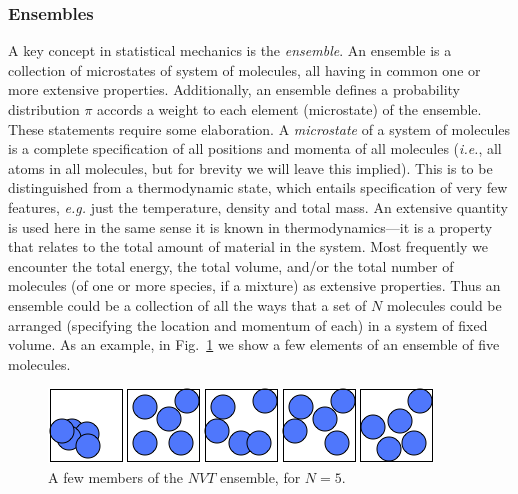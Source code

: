 \documentclass[]{article}
\begin{document}
\subsubsection{Ensembles}\label{ensembles}

A key concept in statistical mechanics is the \emph{ensemble}. An
ensemble is a collection of microstates of system of molecules, all
having in common one or more extensive properties. Additionally, an
ensemble defines a probability distribution $\pi$ accords a weight to each
element (microstate) of the ensemble. These statements require some
elaboration. A \emph{microstate} of a system of molecules is a complete
specification of all positions and momenta of all molecules
(\emph{i.e.}, all atoms in all molecules, but for brevity we will leave
this implied). This is to be distinguished from a thermodynamic state,
which entails specification of very few features, \emph{e.g.} just the
temperature, density and total mass. An extensive quantity is used here
in the same sense it is known in thermodynamics---it is a property that
relates to the total amount of material in the system. Most frequently
we encounter the total energy, the total volume, and/or the total number
of molecules (of one or more species, if a mixture) as extensive
properties. Thus an ensemble could be a collection of all the ways that
a set of $N$ molecules could be arranged (specifying the location
and momentum of each) in a system of fixed volume. As an example, in
Fig.~\ref{fig:NVT} we show a few elements of an ensemble of five molecules.
\begin{figure}
\includegraphics[width=\textwidth]{image001}
\caption{\label{fig:NVT}A few members of the $NVT$ ensemble, for $N = 5$.}
\end{figure}
\end{document}
